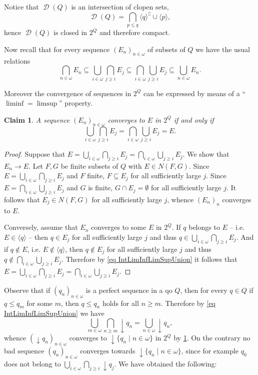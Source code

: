 \documentclass{article}%
\theoremstyle{plain}
\newtheorem{lemma}[theorem]{Properties}
\newtheorem{lemma}[theorem]{Lemma}
\newtheorem{lemma}[theorem]{Fact}
\newtheorem{lemma}[theorem]{Facts}
\newtheorem{lemma}{Claim}
\theoremstyle{definition}
\theoremstyle{remark}
\DeclareMathOperator{\dcl}{\downarrow}
\DeclareMathOperator{\Down}{\mathcal{D}} %
\newcommand{\ClUp}[1] {\langle #1\rangle}
\begin{document}
Notice that $\Down(Q)$ is an intersection of clopen sets,
\[\Down(Q)=\bigcap_{p\leq q} \ClUp{q}^{\complement} \cup \ClUp{p},\]
hence $\Down(Q)$ is closed in $2^{Q}$ and therefore compact.

Now recall that for every sequence $(E_{n})_{n\in\omega}$ of subsets of $Q$ we have the usual relations
\begin{equation}\label{eq IntLimInfLimSupUnion}
\bigcap_{n\in\omega} E_{n}\subseteq \bigcup_{i\in \omega}\bigcap_{j\geq i}E_{j}\subseteq \bigcap_{i\in \omega}\bigcup_{j\geq i}E_{j}\subseteq \bigcup_{n\in \omega} E_{n}.
\end{equation}


Moreover the convergence of sequences in $2^{Q}$ can be expressed by means of a \enquote{$\liminf=\limsup$} property. 

\begin{lemma}\label{fac liminf=limsup}
A sequence $(E_{n})_{n\in\omega}$ converges to $E$ in $2^{Q}$ if and only if
\[\bigcup_{i\in \omega}\bigcap_{j\geq i}E_{j}=\bigcap_{i\in \omega}\bigcup_{j\geq i}E_{j}=E.\]
\end{lemma}
\begin{proof}
Suppose that $E=\bigcup_{i\in \omega}\bigcap_{j\geq i}E_{j}=\bigcap_{i\in \omega}\bigcup_{j\geq i}E_{j}$. We show that $E_{n}\to E$. Let $F,G$ be finite subsets of $Q$ with $E\in N(F,G)$. Since $E=\bigcup_{i\in \omega}\bigcap_{j\geq i}E_{j}$ and $F$ finite, $F\subseteq E_{j}$ for all sufficiently large $j$. Since $E=\bigcap_{i\in \omega}\bigcup_{j\geq i}E_{j}$ and $G$ is finite, $G\cap E_{j}=\emptyset$ for all sufficiently large $j$. It follows that $E_{j}\in N(F,G)$ for all sufficiently large $j$, whence $(E_{n})_{n}$ converges to $E$.

Conversely, assume that $E_{n}$ converges to some $E$ in $2^{Q}$. If $q$ belongs to $E$ -- i.e. $E\in \ClUp{q}$ -- then $q\in E_{j}$ for all sufficiently large $j$ and thus $q\in \bigcup_{i\in \omega}\bigcap_{j\geq i}E_{j}$. And if $q\notin E$, i.e. $E\notin \ClUp{q}$, then $q\notin E_{j}$ for all sufficiently large $j$ and thus $q\notin \bigcap_{i\in\omega}\bigcup_{j\geq i}E_{j}$. Therefore by \cref{eq IntLimInfLimSupUnion} it follows that $E=\bigcup_{i\in \omega}\bigcap_{j\geq i}E_{j}=\bigcap_{i\in \omega}\bigcup_{j\geq i}E_{j}$.
\end{proof}

Observe that if $(q_{n})_{n\in\omega}$ is a perfect sequence in a qo $Q$, then for every $q\in Q$ if $q \leq q_{m}$ for some $m$, then $q\leq q_{n}$ holds for all $n\geq m$. Therefore by \cref{eq IntLimInfLimSupUnion} we have
\[
\bigcup_{m\in\omega}\bigcap_{n\geq m} \dcl q_{n}=\bigcup_{n\in\omega}\dcl q_{n},
\]
whence $(\dcl q_{n})_{n\in\omega}$ converges to $\dcl \{q_{n}\mid n\in\omega\}$ in $2^{Q}$ by \cref{fac liminf=limsup}. On the contrary no bad sequence $(q_{n})_{n\in\omega}$ converges towards $\dcl\{q_{n}\mid n\in\omega\}$, since for example $q_{0}$ does not belong to $\bigcup_{i\in \omega}\bigcap_{j\geq i}\dcl q_{j}$. We have obtained the following:  
\end{document}
